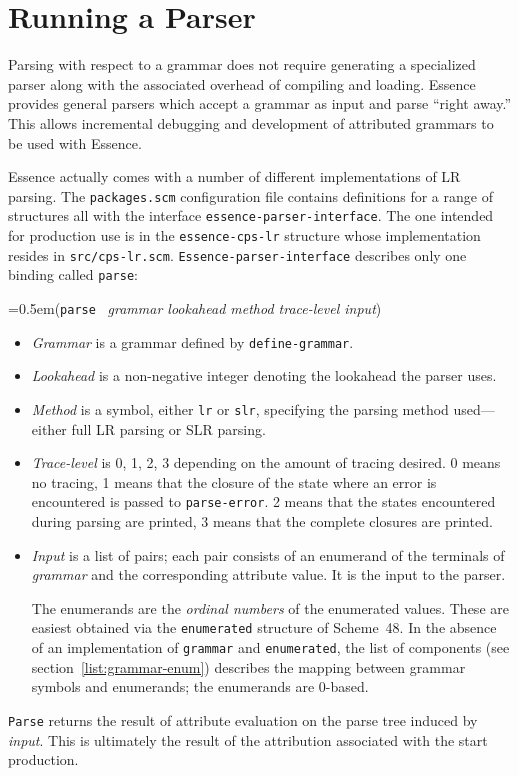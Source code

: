 \documentclass{article}
\newcommand{\var}[1]{\textit{#1}}
\newcommand{\ide}[1]{{\frenchspacing\textnormal{\texttt{#1}}}}
\newcommand{\pproto}[2]{\noindent%
{\texonly\spaceskip=0.5em\endtexonly{}#1}%
~\nobreak\textrm{#2}}
\newcommand{\proto}[3]{\par\bigskip\begin{flushleft}\pproto{(\texttt{#1}}{\textit{#2})}\hspace*{\fill}{#3}\end{flushleft}}
\newcommand{\codefont}[1]{\texttt{#1}}
\newcommand{\filename}[1]{\texttt{#1}}
\begin{document}
\section{Running a Parser}
\label{sec:running-a-parser}

Parsing with respect to a grammar does not require generating a
specialized parser along with the associated overhead of compiling and
loading.  Essence provides general parsers which accept a grammar as
input and parse ``right away.''  This allows incremental debugging and 
development of attributed grammars to be used with Essence.

Essence actually comes with a number of different implementations of
LR parsing.  The \filename{packages.scm} configuration file contains
definitions for a range of structures all with the interface
\codefont{essence-parser-interface}.  The one intended for production use is in the
\codefont{essence-cps-lr} structure whose implementation resides in
\filename{src/cps-lr.scm}.  \codefont{Essence-parser-interface} describes only 
one binding called \codefont{parse}:

\label{proc:parse}
\proto{parse}{grammar lookahead method trace-level input}{procedure}
%
\begin{itemize}
\item \var{Grammar} is a grammar defined by \codefont{define-grammar}.
\item \var{Lookahead} is a non-negative integer denoting the
  lookahead the parser uses.
\item \var{Method} is a symbol, either \codefont{lr} or
  \codefont{slr}, specifying the parsing method used---either full LR
  parsing or SLR parsing.
\item \var{Trace-level} is 0, 1, 2, 3 depending on the amount of
  tracing desired.  0 means no tracing, 1 means that the closure of
  the state where an error is encountered is passed to
  \ide{parse-error}.  2 means that the states encountered during
  parsing are printed, 3 means that the complete closures are printed.
\item \var{Input} is a list of pairs; each pair consists of an
  enumerand of the terminals of \var{grammar} and the corresponding attribute value.  It is the
  input to the parser. 
  
  The enumerands are the \emph{ordinal numbers} of the enumerated
  values.  These are easiest obtained via the \codefont{enumerated} structure
  of Scheme~48.  In the absence of an implementation of \codefont{grammar} and
  \codefont{enumerated}, the list of components (see
  section~\ref{list:grammar-enum})
  describes the mapping between grammar symbols and
  enumerands; the enumerands are 0-based.
\end{itemize}
%
\ide{Parse} returns the result of attribute evaluation on the parse
tree induced by \var{input}.  This is ultimately the result of the
attribution associated with the start production.
\end{document}
